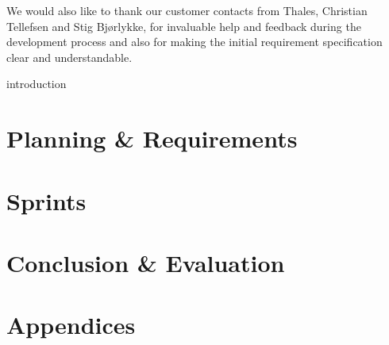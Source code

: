 \documentclass[a4paper, 11pt]{report}
\begin{document}
We would also like to thank our customer contacts from Thales, Christian
Tellefsen and Stig Bjørlykke, for invaluable help and feedback during the
development process and also for making the initial requirement 
specification clear and understandable.


\clearpage
{}
{}
 {introduction}

\clearpage
{}
{}
\tableofcontents

\clearpage
{}
{}
\listoffigures

\clearpage
{}
{}
\listoftables




\clearpage
{}
\part{Planning \& Requirements}









\part{Sprints}






\part{Conclusion \& Evaluation}




\clearpage
{}
{}
{}



\part{Appendices}
\appendix





\end{document}
